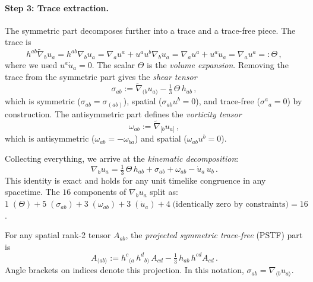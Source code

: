 \paragraph{Step 3: Trace extraction.}
The symmetric part decomposes further into a trace and a
trace-free piece.  The trace is
\begin{equation}
h^{ab}\tilde{\nabla}_b u_a
= h^{ab}\nabla_b u_a
= \nabla_a u^a + u^a u^b \nabla_b u_a
= \nabla_a u^a + u^a \dot{u}_a
= \nabla_a u^a =: \Theta\,,
\end{equation}
where we used $u^a \dot{u}_a = 0$.  The scalar $\Theta$ is the
\emph{volume expansion}.  Removing the trace from the symmetric
part gives the \emph{shear tensor}
\begin{equation}\label{eq:sigma-extract}
\sigma_{ab}
:= \tilde{\nabla}_{(b} u_{a)}
   - \tfrac{1}{3}\,\Theta\, h_{ab}\,,
\end{equation}
which is symmetric ($\sigma_{ab} = \sigma_{(ab)}$), spatial
($\sigma_{ab} u^b = 0$), and trace-free
($\sigma^a{}_a = 0$) by construction.  The antisymmetric part
defines the \emph{vorticity tensor}
\begin{equation}\label{eq:omega-extract}
\omega_{ab}
:= \tilde{\nabla}_{[b} u_{a]}\,,
\end{equation}
which is antisymmetric ($\omega_{ab} = -\omega_{ba}$) and spatial
($\omega_{ab} u^b = 0$).

Collecting everything, we arrive at the \emph{kinematic
decomposition}:
\begin{equation}\label{eq:u-decomp}
\boxed{
\nabla_b u_a
= \tfrac{1}{3}\,\Theta\,h_{ab}
  + \sigma_{ab} + \omega_{ab}
  - \dot{u}_a\, u_b
}\,.
\end{equation}
This identity is exact and holds for any unit timelike
congruence in any spacetime.  The $16$ components of
$\nabla_b u_a$ split as:
$1\;(\Theta) + 5\;(\sigma_{ab}) + 3\;(\omega_{ab})
+ 3\;(\dot{u}_a) + 4\;\text{(identically zero by constraints)}
= 16$.

\begin{definition}\label{def:pstf}
For any spatial rank-2 tensor $A_{ab}$, the \emph{projected
symmetric trace-free} (PSTF) part is
\begin{equation}\label{eq:pstf-def}
A_{\langle ab\rangle}
:= h^c{}_{(a}\,h^d{}_{b)}\,A_{cd}
   - \tfrac{1}{3}\,h_{ab}\,h^{cd}A_{cd}\,.
\end{equation}
Angle brackets on indices denote this projection. In this
notation, $\sigma_{ab} = \nabla_{\langle b} u_{a\rangle}$.
\end{definition}



